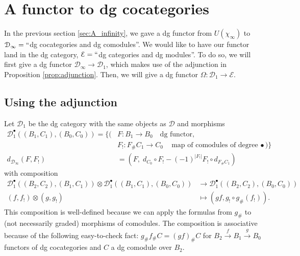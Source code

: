 \section{A functor to dg cocategories}
In the previous section \ref{sec:A_infinity},
we gave a dg functor from $U(\chi_\infty)$ 
to $\mathcal{D}_\infty = ``$dg cocategories 
and dg comodules''. We would like to have our 
functor land in the dg category, 
$\mathcal{E} = ``$dg categories and dg 
modules''. To do so, we will first give a 
dg functor $\mathcal{D}_\infty \to 
\mathcal{D}_1$, 
which makes use of the adjunction in 
Proposition \ref{prop:adjunction}. Then, 
we will give a dg functor $\Omega: 
\mathcal{D}_1 \to \mathcal{E}$.

\subsection{Using the adjunction}
Let $\mathcal{D}_1$ be the 
dg category with the same objects 
as $\mathcal{D}$ and morphisms
\begin{align*}
\mathcal{D}_1^\bullet(
  (B_1, C_1), (B_0,C_0))
= \big\{ \big(
& F: 
B_1 \to B_0 \quad \textrm{dg functor},\\
& F_!:
F_{\#}C_1 \to C_0 \quad \textrm{map of 
comodules of degree $\bullet$}
\big) \big\}\\
d_{\mathcal{D}_\infty}(F,F_!)
&=
(F,\; d_{C_0} \circ F_! - (-1)^{|F_!|} 
F_! \circ d_{F_\# C_1})
\end{align*}
with composition
\begin{align*}  
\mathcal{D}_1^\bullet(
  (B_2, C_2), (B_1, C_1)) \otimes  
  \mathcal{D}_1^\bullet(
  (B_1, C_1), (B_0, C_0))
&\to
\mathcal{D}_1^\bullet(
  (B_2, C_2), (B_0, C_0))\\
(f,f_!) \otimes (g, g_!)
&\mapsto
(gf, g_!\circ g_\#(f_!)).
\end{align*}
This composition is well-defined because 
we can apply the formulas from $g_\#$ to 
(not necessarily graded) morphisms of 
comodules. The composition is associative 
because of the following easy-to-check 
fact: $g_\#f_\#C = (gf)_\#C$ for 
$B_2 \xrightarrow{f} B_1 \xrightarrow{g} 
B_0$ functors of dg cocategories and $C$ 
a dg comodule over $B_2$.

